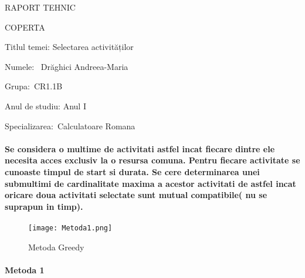 \documentclass[12pt, a4paper,oneside]{article}
\begin{document}
\begin{center}
\Huge
{RAPORT TEHNIC}
\end{center}
\vspace{3em}
\begin{center}
\huge
{COPERTA}
\end{center}
\Large
\vspace{5em}

Titlul temei: Selectarea activităților

\Large
\vspace{2em} 

Numele: \ Drăghici Andreea-Maria

\Large
\vspace{2em} 
Grupa:\ CR1.1B
\large
\vspace{2em} 

Anul de studiu: Anul I

\Large
\vspace{2em} 

Specializarea:\ Calculatoare Romana

\begin{center}
\huge

\end{center}
\vspace{10em} 
\Large
\paragraph{Se considera o multime de activitati astfel incat fiecare dintre ele necesita acces exclusiv la o resursa comuna. Pentru fiecare activitate se cunoaste timpul de start si durata. Se cere determinarea unei submultimi de cardinalitate maxima a acestor activitati de astfel incat oricare doua activitati selectate sunt mutual compatibile( nu se suprapun in timp). }
\Large
\begin{center}

\vspace{3em}
\end{center}
\begin{figure}
\texttt{[image: Metoda1.png]}
\caption{Metoda Greedy}
\end{figure}
\paragraph{Metoda 1\\}
\end{document}
